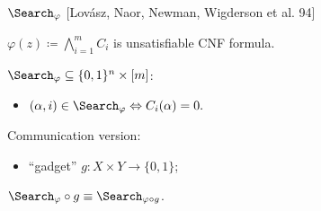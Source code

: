 \begin{frame}{$\Search_{\varphi}$ [Lov{\'{a}}sz, Naor, Newman, Wigderson et al. 94]}
    
    $\varphi(z) \coloneqq \bigwedge\limits_{i = 1}^{m} C_i$ is unsatisfiable CNF formula.
    \pause
    
    $\Search_{\varphi} \subseteq \{0, 1\}^n \times [m]$:
    \begin{itemize}
        \item $(\alpha, i) \in \Search_{\varphi} \Leftrightarrow C_{i}(\alpha) = 0.$
    \end{itemize}

    \pause
    \vspace{0.1cm}
    Communication version:
    \begin{itemize}
        \item ``gadget'' $g\colon X \times Y \to \{0, 1\}$;
    \end{itemize}

    \pause
    \begin{center}
        
    \end{center}


    $\Search_{\varphi} \circ g \equiv \Search_{\varphi \circ g}$.
\end{frame}


